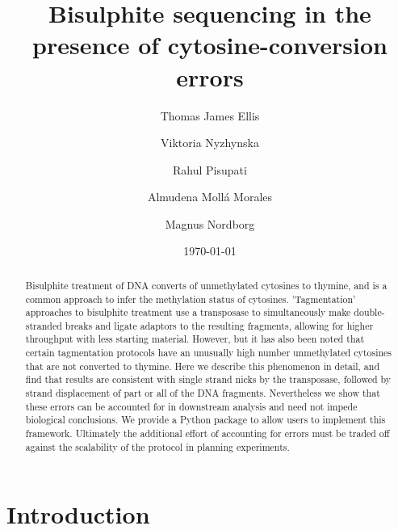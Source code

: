 \documentclass[12pt,longbibliography]{article}
\title{Bisulphite sequencing in the presence of cytosine-conversion errors} %
\author{
    Thomas James Ellis 
    \and
    Viktoria Nyzhynska
    \and
    Rahul Pisupati 
    \and
    Almudena Moll\'a Morales
    \and
    Magnus Nordborg
}
\date{\today} %
\begin{document}
\maketitle

\begin{abstract}
    Bisulphite treatment of DNA converts of unmethylated cytosines to thymine, and is a common approach to infer the methylation status of cytosines.
    'Tagmentation' approaches to bisulphite treatment use a transposase to simultaneously make double-stranded breaks and ligate adaptors to the resulting fragments, allowing for higher throughput with less starting material.
    However, but it has also been noted that certain tagmentation protocols have an unusually high number unmethylated cytosines that are not converted to thymine.
    Here we describe this phenomenon in detail, and find that results are consistent with single strand nicks by the transposase, followed by strand displacement of part or all of the DNA fragments.
    Nevertheless we show that these errors can be accounted for in downstream analysis and need not impede biological conclusions.
    We provide a Python package to allow users to implement this framework.
    Ultimately the additional effort of accounting for errors must be traded off against the scalability of the protocol in planning experiments.
    \end{abstract}






\maketitle


\section{Introduction}
\end{document}
